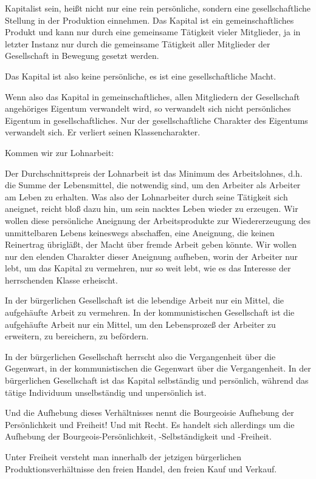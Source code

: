 \documentclass[letterpaper]{article}
\begin{document}
Kapitalist sein, heißt nicht nur eine rein persönliche, sondern eine gesellschaftliche Stellung in der Produktion einnehmen. Das Kapital ist ein gemeinschaftliches Produkt und kann nur durch eine gemeinsame Tätigkeit vieler Mitglieder, ja in letzter Instanz nur durch die gemeinsame Tätigkeit aller Mitglieder der Gesellschaft in Bewegung gesetzt werden. 

Das Kapital ist also keine persönliche, es ist eine gesellschaftliche Macht.

Wenn also das Kapital in gemeinschaftliches, allen Mitgliedern der Gesellschaft angehöriges Eigentum verwandelt wird, so verwandelt sich nicht persönliches Eigentum in gesellschaftliches. Nur der gesellschaftliche Charakter des Eigentums verwandelt sich. Er verliert seinen Klassencharakter.

Kommen wir zur Lohnarbeit:

Der Durchschnittspreis der Lohnarbeit ist das Minimum des Arbeitslohnes, d.h. die Summe der Lebensmittel, die notwendig sind, um den Arbeiter als Arbeiter am Leben zu erhalten. Was also der Lohnarbeiter durch seine Tätigkeit sich aneignet, reicht bloß dazu hin, um sein nacktes Leben wieder zu erzeugen. Wir wollen diese persönliche Aneignung der Arbeitsprodukte zur Wiedererzeugung des unmittelbaren Lebens keineswegs abschaffen, eine Aneignung, die keinen Reinertrag übrigläßt, der Macht über fremde Arbeit geben könnte. Wir wollen nur den elenden Charakter dieser Aneignung aufheben, worin der Arbeiter nur lebt, um das Kapital zu vermehren, nur so weit lebt, wie es das Interesse der herrschenden Klasse erheischt.

In der bürgerlichen Gesellschaft ist die lebendige Arbeit nur ein Mittel, die aufgehäufte Arbeit zu vermehren. In der kommunistischen Gesellschaft ist die aufgehäufte Arbeit nur ein Mittel, um den Lebensprozeß der Arbeiter zu erweitern, zu bereichern, zu befördern.

In der bürgerlichen Gesellschaft herrscht also die Vergangenheit über die Gegenwart, in der kommunistischen die Gegenwart über die Vergangenheit. In der bürgerlichen Gesellschaft ist das Kapital selbständig und persönlich, während das tätige Individuum unselbständig und unpersönlich ist.

Und die Aufhebung dieses Verhältnisses nennt die Bourgeoisie Aufhebung der Persönlichkeit und Freiheit! Und mit Recht. Es handelt sich allerdings um die Aufhebung der Bourgeois-Persönlichkeit, -Selbständigkeit und -Freiheit.

Unter Freiheit versteht man innerhalb der jetzigen bürgerlichen Produktionsverhältnisse den freien Handel, den freien Kauf und Verkauf.
\end{document}
